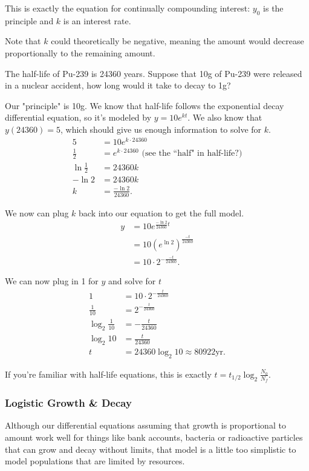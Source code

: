 This is exactly the equation for continually compounding interest: $y_0$ is the principle and $k$ is an interest rate.


Note that $k$ could theoretically be negative, meaning the amount would decrease proportionally to the remaining amount.
\begin{example}
	The half-life of Pu-239 is 24360 years.
	Suppose that 10g of Pu-239 were released in a nuclear accident, how long would it take to decay to 1g?
\end{example}
\begin{answer}
	Our "principle" is 10g.
	We know that half-life follows the exponential decay differential equation, so it's modeled by $y = 10e^{kt}$.
	We also know that $y(24360)=5$, which should give us enough information to solve for $k$.
	\begin{align*}
		5 &= 10e^{k\cdot 24360} \\
		\frac{1}{2} &= e^{k\cdot 24360} \text{ (see the ``half" in half-life?)} \\
		\ln{\frac{1}{2}} &= 24360k \\
		-\ln{2} &= 24360k \\
		k &= \frac{-\ln{2}}{24360}.
	\end{align*}
	
	We now can plug $k$ back into our equation to get the full model.
	\begin{align*}
		y &= 10e^{\frac{-\ln{2}}{24360}t} \\
		&= 10\left(e^{\ln{2}}\right)^{\frac{-t}{24360}} \\
		&= 10\cdot2^{-\frac{-t}{24360}}.
	\end{align*}
	
	We can now plug in 1 for $y$ and solve for $t$
	\begin{align*}
		1 &= 10\cdot2^{-\frac{t}{24360}} \\
		\frac{1}{10} &= 2^{-\frac{t}{24360}} \\
		\log_{2}{\frac{1}{10}} &= -\frac{t}{24360} \\
		\log_{2}{10} &= \frac{t}{24360} \\
		t &= 24360\log_{2}{10} \approx 80922\text{yr}.
	\end{align*}
	
	If you're familiar with half-life equations, this is exactly $t=t_{1/2}\log_{2}{\frac{N_0}{N_f}}$.
\end{answer}

\subsubsection{Logistic Growth \& Decay}
Although our differential equations assuming that growth is proportional to amount work well for things like bank accounts, bacteria or radioactive particles that can grow and decay without limits, that model is a little too simplistic to model populations that are limited by resources.

